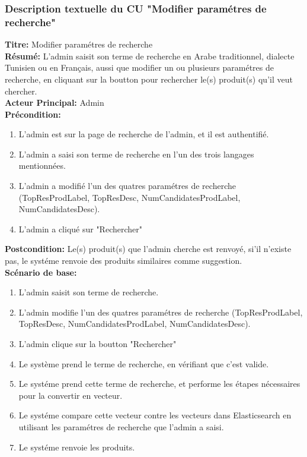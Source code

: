 \subsubsection{Description textuelle du CU "Modifier paramétres de recherche"}
\noindent
\textbf{Titre:} Modifier paramétres de recherche \\
\textbf{Résumé:} L'admin saisit son terme de recherche en Arabe traditionnel, dialecte Tunisien ou en Français, aussi que modifier un ou plusieurs paramétres de recherche, en cliquant sur la boutton pour rechercher le(s) produit(s) qu'il veut chercher. \\
\textbf{Acteur Principal:} Admin \\
\textbf{Précondition:} \begin{enumerate}
	\item L'admin est sur la page de recherche de l'admin, et il est authentifié.
	\item L'admin a saisi son terme de recherche en l'un des trois langages mentionnées.
	\item L'admin a modifié l'un des quatres paramétres de recherche (TopResProdLabel, TopResDesc, NumCandidatesProdLabel, NumCandidatesDesc).
	\item L'admin a cliqué sur "Rechercher"
\end{enumerate}
\textbf{Postcondition:} Le(s) produit(s) que l'admin cherche est renvoyé, si'il n'existe pas, le systéme renvoie des produits similaires comme suggestion. \\
\textbf{Scénario de base: }
\begin{enumerate}
	\item L'admin saisit son terme de recherche.
	\item L'admin modifie l'un des quatres paramétres de recherche (TopResProdLabel, TopResDesc, NumCandidatesProdLabel, NumCandidatesDesc).
	\item L'admin clique sur la boutton "Rechercher"
	\item Le système prend le terme de recherche, en vérifiant que c'est valide.
	\item Le systéme prend cette terme de recherche, et performe les étapes nécessaires pour la convertir en vecteur.
	\item Le systéme compare cette vecteur contre les vecteurs dans Elasticsearch en utilisant les paramétres de recherche que l'admin a saisi.
	\item Le systéme renvoie les produits.
\end{enumerate}

